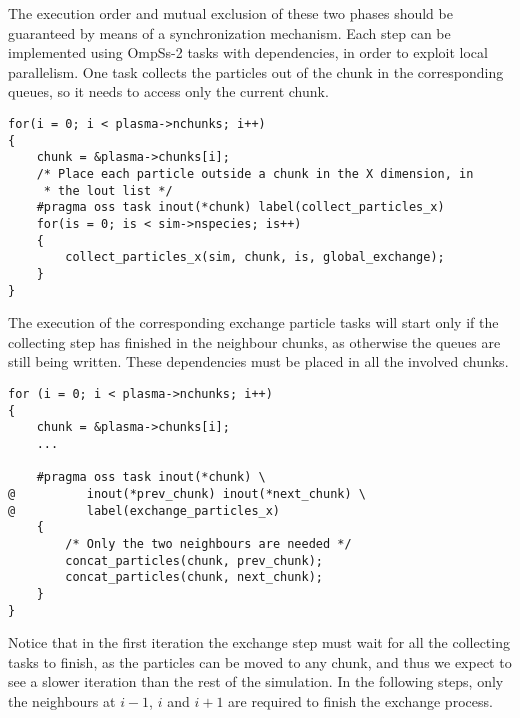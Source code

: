 The execution order and mutual exclusion of these two phases should be 
guaranteed by means of a synchronization mechanism. Each step can be implemented 
using OmpSs-2 tasks with dependencies, in order to exploit local parallelism.  
One task collects the particles out of the chunk in the corresponding queues, so 
it needs to access only the current chunk.
%
\begin{lstlisting}
for(i = 0; i < plasma->nchunks; i++)
{
	chunk = &plasma->chunks[i];
	/* Place each particle outside a chunk in the X dimension, in
	 * the lout list */
	#pragma oss task inout(*chunk) label(collect_particles_x)
	for(is = 0; is < sim->nspecies; is++)
	{
		collect_particles_x(sim, chunk, is, global_exchange);
	}
}
\end{lstlisting}
%
The execution of the corresponding exchange particle tasks will start only if 
the collecting step has finished in the neighbour chunks, as otherwise the 
queues are still being written. These dependencies must be placed in all the 
involved chunks.
%
\begin{lstlisting}
for (i = 0; i < plasma->nchunks; i++)
{
	chunk = &plasma->chunks[i];
	...

	#pragma oss task inout(*chunk) \
@          inout(*prev_chunk) inout(*next_chunk) \
@          label(exchange_particles_x)
	{
		/* Only the two neighbours are needed */
		concat_particles(chunk, prev_chunk);
		concat_particles(chunk, next_chunk);
	}
}
\end{lstlisting}
%
Notice that in the first iteration the exchange step must wait for all the 
collecting tasks to finish, as the particles can be moved to any chunk, and thus 
we expect to see a slower iteration than the rest of the simulation. In the 
following steps, only the neighbours at $i-1$, $i$ and $i+1$ are required to 
finish the exchange process.


